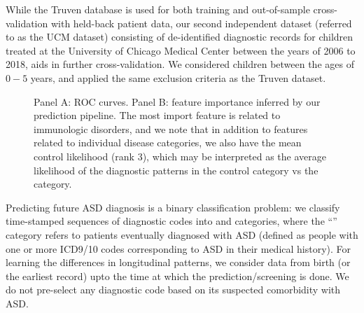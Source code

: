 \documentclass[onecolumn, compsoc,11pt]{IEEEtran}
\renewcommand{\captionN}[1]{\caption{\color{CadetBlue4!80!black} \sffamily \fontsize{9}{10}\selectfont #1  }}
\begin{document}
While the Truven database is used for both training and out-of-sample cross-validation with held-back patient data, our second independent dataset (referred to as the UCM dataset) consisting of de-identified diagnostic records for children treated at the University of Chicago Medical Center between the years of 2006 to 2018, aids in further cross-validation. We considered children between the ages of $0-5$ years, and  applied the same exclusion criteria as the Truven dataset.

\begin{figure}

  \vspace{-10pt}                                                                                                                                                                                                                                                                                                                                                                           
   \tikzexternaldisable

     \vspace{-10pt}

  \captionN{Panel A:  ROC curves. Panel B: feature importance inferred by our prediction pipeline. The most import feature is related to immunologic disorders, and we note that in addition to features related to individual disease categories, we also have the mean control likelihood (rank 3), which may be interpreted as the average likelihood of the diagnostic patterns in the control category vs the \treatment category. 
     }\label{fig1}
        \vspace{-15pt}

\end{figure}Predicting  future ASD diagnosis   is a  binary classification problem: we classify time-stamped sequences of diagnostic codes  into \treatment and \control categories, where the ``\treatment'' category refers to patients eventually  diagnosed with ASD (defined as people with one or more ICD9/10 codes corresponding to ASD in their medical history). 
For learning the differences in longitudinal patterns, we consider  data from birth (or the earliest record) upto the time at which the prediction/screening is done.
We do not pre-select any diagnostic   code based on its  suspected comorbidity with ASD. 
\end{document}
